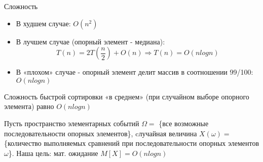 \noindent Сложность
\begin{itemize}
    \item В худшем случае: $O(n^2)$
    \item В лучшем случае (опорный элемент - медиана):
    $$
    T(n) = 2T(\frac{n}{2})+ O(n) \Rightarrow T(n) = O(n log n)
    $$
    \item В «плохом» случае - опорный элемент делит массив в соотношении 99/100: $O(n log n)$
\end{itemize}

 Сложность быстрой сортировки «в среднем» (при случайном выборе опорного элемента) равно $O (n log n)$

Пусть пространство элементарных событий $\Omega =$ \{все возможные последовательности опорных элементов\}, cлучайная величина $X(\omega) =$ \{количество выполняемых сравнений при последовательности опорных элементов $\omega$\}. Наша цель: мат. ожидание $M[X] = O (n log n)$


